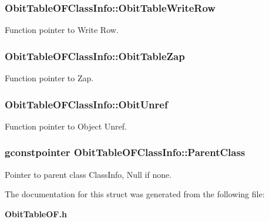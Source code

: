 \subsubsection{ {\bf Obit\-Table\-OFClass\-Info::Obit\-Table\-Write\-Row}}\label{structObitTableOFClassInfo_o26}


Function pointer to Write Row. 

\subsubsection{ {\bf Obit\-Table\-OFClass\-Info::Obit\-Table\-Zap}}\label{structObitTableOFClassInfo_o19}


Function pointer to Zap. 

\subsubsection{ {\bf Obit\-Table\-OFClass\-Info::Obit\-Unref}}\label{structObitTableOFClassInfo_o11}


Function pointer to Object Unref. 

\subsubsection{\setlength{\rightskip}{0pt plus 5cm}gconstpointer {\bf Obit\-Table\-OFClass\-Info::Parent\-Class}}\label{structObitTableOFClassInfo_o3}


Pointer to parent class Class\-Info, Null if none. 



The documentation for this struct was generated from the following file:\begin{CompactItemize}
\item 
{\bf Obit\-Table\-OF.h}\end{CompactItemize}
